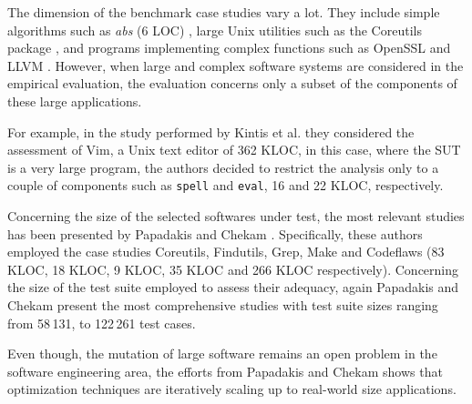 The dimension of the benchmark case studies vary a lot. They include simple algorithms such as \textit{abs} (6 LOC) \cite{tokumoto2016muvm}, large Unix utilities such as the Coreutils package \cite{hariri2019comparing,papadakis2018mutation,chekam2017empirical}, and programs implementing complex functions such as OpenSSL and LLVM \cite{denisov2018mull}.
However, when large and complex software systems are considered in the empirical evaluation, the evaluation concerns only a subset of the components of these large applications.

For example, in the study performed by Kintis et al. \cite{kintis2017detecting} they considered the assessment of Vim, a Unix text editor of 362 KLOC, in this case, where the SUT is a very large program, the authors decided to restrict the analysis only to a couple of components such as \texttt{spell} and \texttt{eval}, 16 and 22 KLOC, respectively. 


Concerning the size of the selected softwares under test, the most relevant studies has been presented by Papadakis and Chekam \cite{papadakis2018mutation,chekam2017empirical,papadakis2018mutant}. Specifically, these authors employed the case studies Coreutils, Findutils, Grep, Make and Codeflaws (83 KLOC, 18 KLOC, 9 KLOC, 35 KLOC and 266 KLOC respectively). 
Concerning the size of the test suite employed to assess their adequacy, again Papadakis and Chekam \cite{papadakis2018mutation,chekam2017empirical,papadakis2018mutant} present the most comprehensive studies with test suite sizes ranging from 58\,131, to 122\,261 test cases.


Even though, the mutation of large software remains an open problem in the software engineering area, the efforts from Papadakis and Chekam \cite{papadakis2018mutation,chekam2017empirical,papadakis2018mutant} shows that optimization techniques are iteratively scaling up to real-world size applications.





